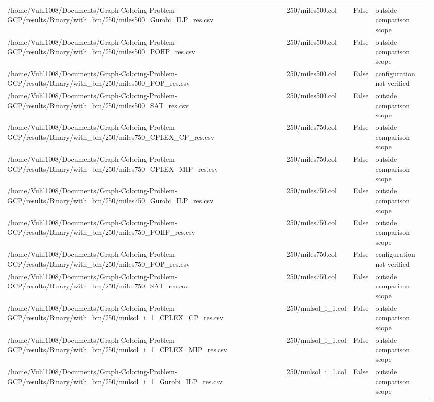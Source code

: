 \begin{table}[htbp]
\begin{tabular}{llll}
/home/Vuhl1008/Documents/Graph-Coloring-Problem-GCP/results/Binary/with\_bm/250/miles500\_Gurobi\_ILP\_res.csv & 250/miles500.col & False & outside comparison scope \\
/home/Vuhl1008/Documents/Graph-Coloring-Problem-GCP/results/Binary/with\_bm/250/miles500\_POHP\_res.csv & 250/miles500.col & False & outside comparison scope \\
/home/Vuhl1008/Documents/Graph-Coloring-Problem-GCP/results/Binary/with\_bm/250/miles500\_POP\_res.csv & 250/miles500.col & False & configuration not verified \\
/home/Vuhl1008/Documents/Graph-Coloring-Problem-GCP/results/Binary/with\_bm/250/miles500\_SAT\_res.csv & 250/miles500.col & False & outside comparison scope \\
/home/Vuhl1008/Documents/Graph-Coloring-Problem-GCP/results/Binary/with\_bm/250/miles750\_CPLEX\_CP\_res.csv & 250/miles750.col & False & outside comparison scope \\
/home/Vuhl1008/Documents/Graph-Coloring-Problem-GCP/results/Binary/with\_bm/250/miles750\_CPLEX\_MIP\_res.csv & 250/miles750.col & False & outside comparison scope \\
/home/Vuhl1008/Documents/Graph-Coloring-Problem-GCP/results/Binary/with\_bm/250/miles750\_Gurobi\_ILP\_res.csv & 250/miles750.col & False & outside comparison scope \\
/home/Vuhl1008/Documents/Graph-Coloring-Problem-GCP/results/Binary/with\_bm/250/miles750\_POHP\_res.csv & 250/miles750.col & False & outside comparison scope \\
/home/Vuhl1008/Documents/Graph-Coloring-Problem-GCP/results/Binary/with\_bm/250/miles750\_POP\_res.csv & 250/miles750.col & False & configuration not verified \\
/home/Vuhl1008/Documents/Graph-Coloring-Problem-GCP/results/Binary/with\_bm/250/miles750\_SAT\_res.csv & 250/miles750.col & False & outside comparison scope \\
/home/Vuhl1008/Documents/Graph-Coloring-Problem-GCP/results/Binary/with\_bm/250/mulsol\_i\_1\_CPLEX\_CP\_res.csv & 250/mulsol\_i\_1.col & False & outside comparison scope \\
/home/Vuhl1008/Documents/Graph-Coloring-Problem-GCP/results/Binary/with\_bm/250/mulsol\_i\_1\_CPLEX\_MIP\_res.csv & 250/mulsol\_i\_1.col & False & outside comparison scope \\
/home/Vuhl1008/Documents/Graph-Coloring-Problem-GCP/results/Binary/with\_bm/250/mulsol\_i\_1\_Gurobi\_ILP\_res.csv & 250/mulsol\_i\_1.col & False & outside comparison scope \\

\end{tabular}
\end{table}
